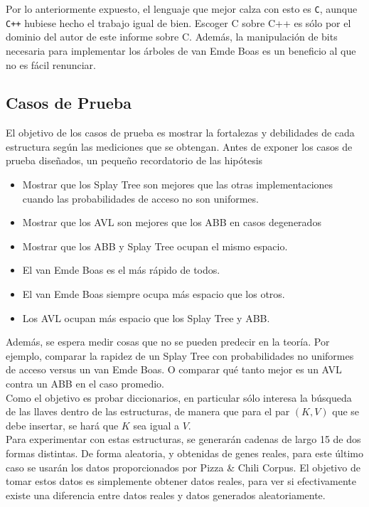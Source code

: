 \documentclass[12pt,letterpaper]{report}
\begin{document}
Por lo anteriormente expuesto, el lenguaje que mejor calza con esto es \texttt{C}, aunque \texttt{C++} hubiese hecho el trabajo igual de bien. Escoger C sobre C++ es sólo por el dominio del autor de este informe sobre C. Además, la manipulación de bits necesaria para implementar los árboles de van Emde Boas es un beneficio al que no es fácil renunciar.


\subsection{Casos de Prueba}
\label{subsec:casos_prueba}
El objetivo de los casos de prueba es mostrar la fortalezas y debilidades de cada estructura según las mediciones que se obtengan. Antes de exponer los casos de prueba diseñados, un pequeño recordatorio de las hipótesis

\begin{itemize}
\item Mostrar que los Splay Tree son mejores que las otras implementaciones cuando las probabilidades de acceso no son uniformes.
\item Mostrar que los AVL son mejores que los ABB en casos degenerados
\item Mostrar que los ABB y Splay Tree ocupan el mismo espacio.
\item El van Emde Boas es el más rápido de todos.
\item El van Emde Boas siempre ocupa más espacio que los otros.
\item Los AVL ocupan más espacio que los Splay Tree y ABB.
\end{itemize}

Además, se espera medir cosas que no se pueden predecir en la teoría. Por ejemplo, comparar la rapidez de un Splay Tree con probabilidades no uniformes de acceso versus un van Emde Boas. O comparar qué tanto mejor es un AVL contra un ABB en el caso promedio.\\

Como el objetivo es probar diccionarios, en particular sólo interesa la búsqueda de las llaves dentro de las estructuras, de manera que para el par $(K, V)$ que se debe insertar, se hará que $K$ sea igual a $V$.\\

Para experimentar con estas estructuras, se generarán cadenas de largo 15 de dos formas distintas. De forma aleatoria, y obtenidas de genes reales, para este último caso se usarán los datos proporcionados por Pizza \& Chili Corpus. El objetivo de tomar estos datos es simplemente obtener datos reales, para ver si efectivamente existe una diferencia entre datos reales y datos generados aleatoriamente.\\
\end{document}
